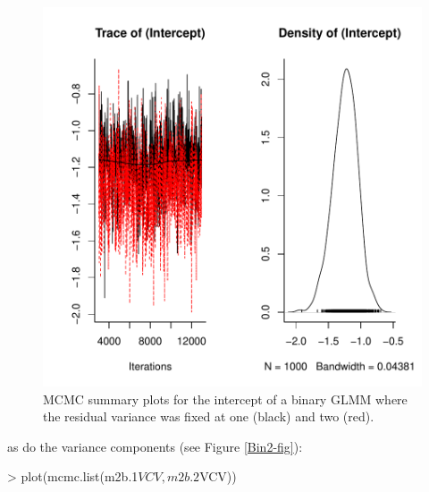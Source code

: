 \documentclass{article}
\begin{document}
\begin{figure}[!h]
\begin{center}
\includegraphics{Lecture2-066}
\end{center}
\caption{MCMC summary plots for the intercept of a binary GLMM where the residual variance was fixed at one (black) and two (red).}
\label{Bin1-fig}
\end{figure}

as do the variance components  (see Figure \ref{Bin2-fig}):

\begin{Schunk}
\begin{Sinput}
> plot(mcmc.list(m2b.1$VCV, m2b.2$VCV))
\end{Sinput}
\end{Schunk}
\end{document}
